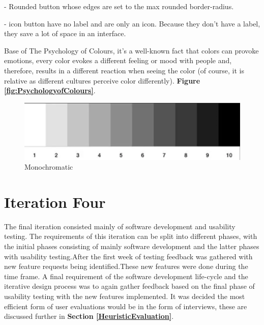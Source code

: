 \documentclass{l4proj}
\begin{document}
- Rounded button whose edges are set to the max rounded border-radius.

- icon button have no label and are only an icon. Because they don’t have a label, they save a lot of space in an interface.

Base of The Psychology of Colours, it’s a well-known fact that colors can provoke emotions, every color evokes a different feeling or mood with people and, therefore, results in a different reaction when seeing the color (of course, it is relative as different cultures perceive color differently). \textbf{Figure \ref{fig:PsychologyofColours}}.
 





\begin{figure}
    \centering
     \includegraphics[width=1\textwidth]{images/mono1.png}
     \caption{Monochromatic}
    \label{fig:Monochromatic}
\end{figure}





\section{Iteration Four}\label{requirementsIterationThree}

The final iteration consisted mainly of software development and usability testing. The requirements of this iteration can be split into different phases, with the initial phases consisting of mainly software development and the latter phases with usability testing.After the first week of testing feedback was gathered with new feature requests being identified.These new features were done during the time frame. A final requirement of the software development life-cycle and the iterative design process was to again gather feedback based on the final phase of usability testing with the new features implemented. It was decided the most efficient form of user evaluations would be in the form of interviews, these are discussed further in \textbf{Section \ref{HeuristicEvaluation}}.
\end{document}
